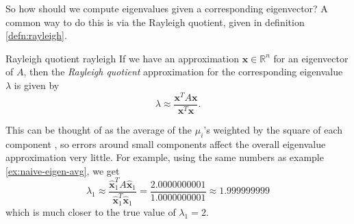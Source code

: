 \documentclass{article}
\let\vec\mathbf
\begin{document}
So how should we compute eigenvalues given a corresponding eigenvector? A common way to do this is via the Rayleigh quotient, given in definition \ref{defn:rayleigh}.

\begin{definition}{Rayleigh quotient \cite{spanish}}{rayleigh}
  If we have an approximation $\vec{x} \in \mathbb{R}^n$ for an eigenvector of $A$, then the \textit{Rayleigh quotient} approximation for the corresponding eigenvalue $\lambda$ is given by
  \begin{equation*}
    \lambda \approx \frac{\vec{x}^TA\vec{x}}{\vec{x}^T\vec{x}}.
  \end{equation*}
\end{definition}

This can be thought of as the average of the $\mu_i$'s weighted by the square of each component \cite{mit-sensitivity}, so errors around small components affect the overall eigenvalue approximation very little. For example, using the same numbers as example \ref{ex:naive-eigen-avg}, we get
\begin{equation*}
  \lambda_1 \approx \frac{\hat{\vec{x}}_1^T A \hat{\vec{x}}_1}{\hat{\vec{x}}_1^T\hat{\vec{x}}_1} = \frac{2.0000000001}{1.0000000001} \approx 1.999999999
\end{equation*}
which is much closer to the true value of $\lambda_1 = 2$.
\end{document}
